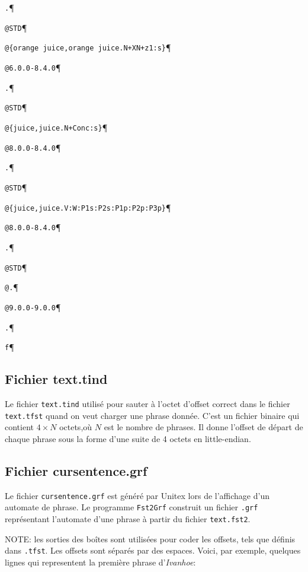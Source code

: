 \noindent\verb$.$\P

\noindent\verb$@STD$\P

\noindent\verb$@{orange juice,orange juice.N+XN+z1:s}$\P

\noindent\verb$@6.0.0-8.4.0$\P

\noindent\verb$.$\P

\noindent\verb$@STD$\P

\noindent\verb$@{juice,juice.N+Conc:s}$\P

\noindent\verb$@8.0.0-8.4.0$\P

\noindent\verb$.$\P

\noindent\verb$@STD$\P

\noindent\verb$@{juice,juice.V:W:P1s:P2s:P1p:P2p:P3p}$\P

\noindent\verb$@8.0.0-8.4.0$\P

\noindent\verb$.$\P

\noindent\verb$@STD$\P

\noindent\verb$@.$\P

\noindent\verb$@9.0.0-9.0.0$\P

\noindent\verb$.$\P

\noindent\verb$f$\P






\subsection{Fichier text.tind}
Le fichier \verb+text.tind+ utilisé pour sauter à l'octet d'offset correct dans le fichier
\verb+text.tfst+ quand on veut charger une phrase donnée. C'est un fichier binaire qui contient $4
\times N$ octets,où $N$ est le nombre de phrases. Il donne l'offset de départ de chaque phrase sous
la forme d'une suite de 4 octets en little-endian.


\subsection{Fichier cursentence.grf}
\label{section-cursentence_grf}
Le fichier  \verb+cursentence.grf+ est généré par Unitex lors de l’affichage d’un automate de
phrase. Le programme \verb+Fst2Grf+ construit un fichier \verb+.grf+ représentant l’automate d’une phrase à partir du fichier \verb+text.fst2+.

\bigskip
\noindent NOTE: les sorties des boîtes sont utilisées pour coder les offsets, tels que définis dans
\verb+.tfst+. Les offsets sont séparés par des espaces. Voici, par exemple, quelques lignes qui representent la première phrase d'\textit{Ivanhoe}:

